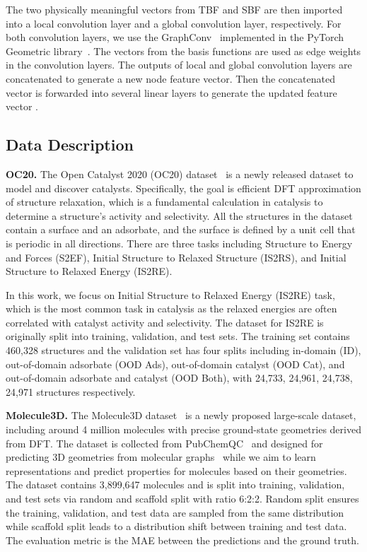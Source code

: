 \documentclass{article}
\begin{document}
The two physically meaningful vectors from TBF and SBF are then imported into
a local convolution layer and a global convolution layer, respectively.
For both convolution layers, we use the GraphConv~\cite{morris2019weisfeiler} implemented in the PyTorch Geometric library~\cite{Fey/Lenssen/2019}.
The vectors from the basis functions are used as edge weights in the convolution layers.
The outputs of local and global convolution layers are concatenated to generate a new node feature vector. 
Then the concatenated vector is forwarded into several linear layers to generate the updated
feature vector .

\subsection{Data Description} \label{sec:data}

\textbf{OC20.} The Open Catalyst 2020 (OC20) dataset~\cite{chanussot2021open} is a newly released dataset to model and discover catalysts.
Specifically, the goal is efficient DFT approximation of structure relaxation, 
which is a fundamental calculation in catalysis to determine a structure's activity and selectivity.
All the structures in the dataset contain a surface and an adsorbate, 
and the surface is defined by a unit cell that is periodic in all directions.
There are three tasks including 
Structure to Energy and Forces (S2EF),
Initial Structure to Relaxed Structure (IS2RS), 
and Initial Structure to Relaxed Energy (IS2RE).

In this work, we focus on Initial Structure to Relaxed Energy (IS2RE) task, which is the most common task in catalysis 
as the relaxed energies are often correlated with catalyst activity and selectivity. 
The dataset for IS2RE is originally split into training, validation, and test sets.
The training set contains 460,328 structures and the validation set has four splits including 
in-domain (ID), out-of-domain adsorbate (OOD Ads), out-of-domain catalyst (OOD Cat), and out-of-domain adsorbate and catalyst (OOD Both), 
with 24,733, 24,961, 24,738, 24,971 structures respectively.

\textbf{Molecule3D.} The Molecule3D dataset~\cite{xu2021molecule3d} is a newly proposed large-scale dataset, including around 4 million molecules with precise ground-state geometries derived from DFT. 
The dataset is collected from PubChemQC~\cite{nakata2017pubchemqc} and designed for predicting 3D geometries from molecular graphs~\cite{xu2021molecule3d} while 
we aim to learn representations and predict properties for molecules based on their geometries.
The dataset contains 3,899,647 molecules and is split into training, validation, and test sets via random and scaffold split with ratio 6:2:2. 
Random split ensures the training, validation, and test data are sampled from the same distribution while 
scaffold split leads to a distribution shift between training and test data.
The evaluation metric is the MAE between the predictions and the ground truth.
\end{document}
